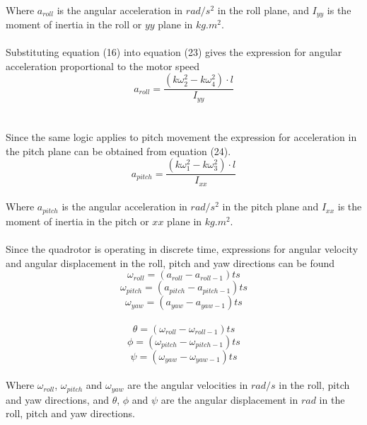 \\
Where $a_{roll}$ is the angular acceleration in $rad/s^2$ in the roll plane, and $I_{yy}$ is the moment of inertia in the roll or $yy$ plane in $kg.m^2$. 
\\\\
Substituting equation (16) into equation (23) gives the expression for angular acceleration proportional to the motor speed
\begin{equation}
a_{roll} = \frac{(k\omega_2^2-k\omega_4^2)\cdot l}{I_{yy}}
\end{equation}
\\\\
Since the same logic applies to pitch movement the expression for acceleration in the pitch plane can be obtained from equation (24). 
\begin{equation}
a_{pitch} = \frac{(k\omega_1^2-k\omega_3^2)\cdot l}{I_{xx}}
\end{equation}
\\
Where $a_{pitch}$ is the angular acceleration in $rad/s^2$ in the pitch plane and $I_{xx}$ is the moment of inertia in the pitch or $xx$ plane in $kg.m^2$. 
\\\\
Since the quadrotor is operating in discrete time, expressions for angular velocity and angular displacement in the roll, pitch and yaw directions can be found 
\begin{equation}
\omega_{roll} = (a_{roll} - a_{roll-1})ts
\end{equation}
\begin{equation}
\omega_{pitch} = (a_{pitch} - a_{pitch-1})ts
\end{equation}
\begin{equation}
\omega_{yaw} = (a_{yaw} - a_{yaw-1})ts
\end{equation}
\\
\begin{equation}
\theta = (\omega_{roll} - \omega_{roll-1})ts
\end{equation}
\begin{equation}
\phi = (\omega_{pitch} - \omega_{pitch-1})ts
\end{equation}
\begin{equation}
\psi = (\omega_{yaw} - \omega_{yaw-1})ts
\end{equation}
\\
Where $\omega_{roll}$, $\omega_{pitch}$ and $\omega_{yaw}$ are the angular velocities in $rad/s$ in the roll, pitch and yaw directions, and $\theta$, $\phi$ and $\psi$ are the angular displacement in $rad$ in the roll, pitch and yaw directions.  

